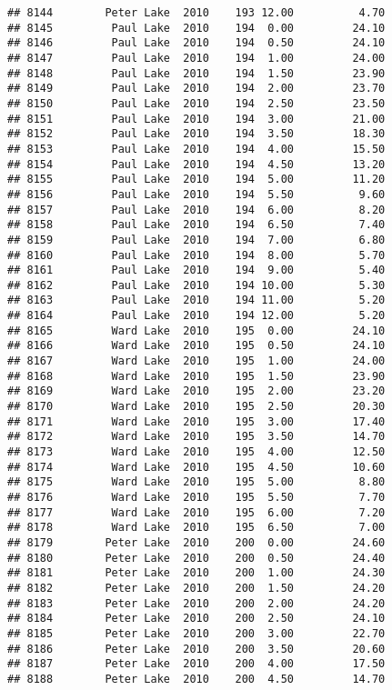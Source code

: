 \documentclass[
]{article}
\begin{document}
\begin{verbatim}
## 8144        Peter Lake  2010    193 12.00          4.70
## 8145         Paul Lake  2010    194  0.00         24.10
## 8146         Paul Lake  2010    194  0.50         24.10
## 8147         Paul Lake  2010    194  1.00         24.00
## 8148         Paul Lake  2010    194  1.50         23.90
## 8149         Paul Lake  2010    194  2.00         23.70
## 8150         Paul Lake  2010    194  2.50         23.50
## 8151         Paul Lake  2010    194  3.00         21.00
## 8152         Paul Lake  2010    194  3.50         18.30
## 8153         Paul Lake  2010    194  4.00         15.50
## 8154         Paul Lake  2010    194  4.50         13.20
## 8155         Paul Lake  2010    194  5.00         11.20
## 8156         Paul Lake  2010    194  5.50          9.60
## 8157         Paul Lake  2010    194  6.00          8.20
## 8158         Paul Lake  2010    194  6.50          7.40
## 8159         Paul Lake  2010    194  7.00          6.80
## 8160         Paul Lake  2010    194  8.00          5.70
## 8161         Paul Lake  2010    194  9.00          5.40
## 8162         Paul Lake  2010    194 10.00          5.30
## 8163         Paul Lake  2010    194 11.00          5.20
## 8164         Paul Lake  2010    194 12.00          5.20
## 8165         Ward Lake  2010    195  0.00         24.10
## 8166         Ward Lake  2010    195  0.50         24.10
## 8167         Ward Lake  2010    195  1.00         24.00
## 8168         Ward Lake  2010    195  1.50         23.90
## 8169         Ward Lake  2010    195  2.00         23.20
## 8170         Ward Lake  2010    195  2.50         20.30
## 8171         Ward Lake  2010    195  3.00         17.40
## 8172         Ward Lake  2010    195  3.50         14.70
## 8173         Ward Lake  2010    195  4.00         12.50
## 8174         Ward Lake  2010    195  4.50         10.60
## 8175         Ward Lake  2010    195  5.00          8.80
## 8176         Ward Lake  2010    195  5.50          7.70
## 8177         Ward Lake  2010    195  6.00          7.20
## 8178         Ward Lake  2010    195  6.50          7.00
## 8179        Peter Lake  2010    200  0.00         24.60
## 8180        Peter Lake  2010    200  0.50         24.40
## 8181        Peter Lake  2010    200  1.00         24.30
## 8182        Peter Lake  2010    200  1.50         24.20
## 8183        Peter Lake  2010    200  2.00         24.20
## 8184        Peter Lake  2010    200  2.50         24.10
## 8185        Peter Lake  2010    200  3.00         22.70
## 8186        Peter Lake  2010    200  3.50         20.60
## 8187        Peter Lake  2010    200  4.00         17.50
## 8188        Peter Lake  2010    200  4.50         14.70

\end{verbatim}
\end{document}
